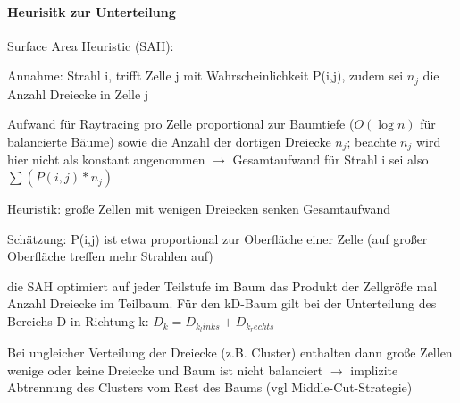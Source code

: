 \documentclass[landscape]{article}
\begin{document}
\begin{multicols}{3}
  \paragraph*{Heurisitk zur Unterteilung}
  \begin{itemize*}
    \item Surface Area Heuristic (SAH):
          \begin{itemize*}
            \item Annahme: Strahl i, trifft Zelle j mit Wahrscheinlichkeit P(i,j), zudem sei $n_j$ die Anzahl Dreiecke in Zelle j
            \item Aufwand für Raytracing pro Zelle proportional zur Baumtiefe ($O(\log n)$ für balancierte Bäume) sowie die Anzahl der dortigen Dreiecke $n_j$; beachte $n_j$ wird hier nicht als konstant angenommen $\rightarrow$ Gesamtaufwand für Strahl i sei also $\sum(P(i,j)*n_j)$
          \end{itemize*}
    \item Heuristik: große Zellen mit wenigen Dreiecken senken Gesamtaufwand
          \begin{itemize*}
            \item Schätzung: P(i,j) ist etwa proportional zur Oberfläche einer Zelle (auf großer Oberfläche treffen mehr Strahlen auf)
            \item die SAH optimiert auf jeder Teilstufe im Baum das Produkt der Zellgröße mal Anzahl Dreiecke im Teilbaum. Für den kD-Baum gilt bei der Unterteilung des Bereichs D in Richtung k: $D_k = D_{k_links} + D_{k_rechts}$
          \end{itemize*}
    \item Bei ungleicher Verteilung der Dreiecke (z.B. Cluster) enthalten dann große Zellen wenige oder keine Dreiecke und Baum ist nicht balanciert $\rightarrow$ implizite Abtrennung des Clusters vom Rest des Baums (vgl Middle-Cut-Strategie)
  \end{itemize*}
  

\end{multicols}
\end{document}
